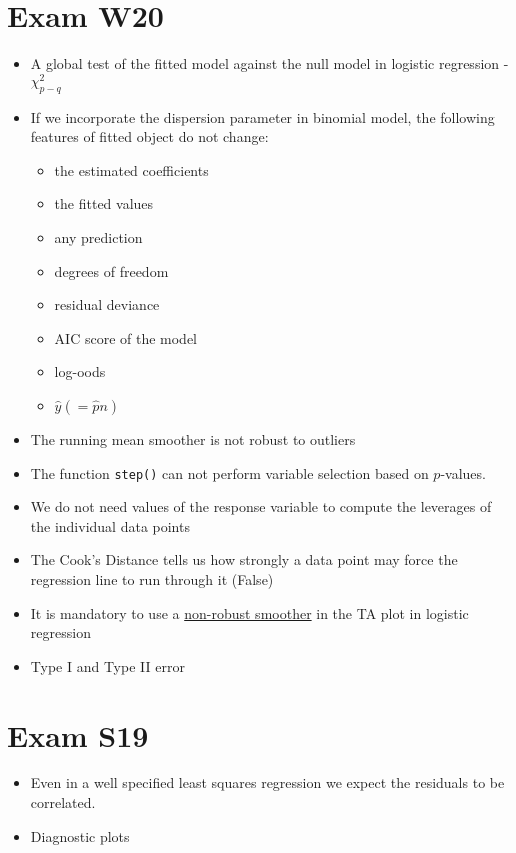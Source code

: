 \documentclass[a4paper]{article}
\begin{document}
\section{Exam W20}
\begin{itemize}
    \item A global test of the fitted model against the null model in logistic regression - $\chi_{p-q}^2$
    \item If we incorporate the dispersion parameter in binomial model, the following features of fitted object do not change:
    \begin{itemize}
        \item the estimated coefficients
        \item the fitted values
        \item any prediction
        \item degrees of freedom
        \item residual deviance
        \item AIC score of the model
        \item log-oods
        \item $\hat{y}(=\hat{p}n)$
    \end{itemize}
    \item The running mean smoother is not robust to outliers
    \item The function \texttt{step()} can not perform variable selection based on $p$-values.
    \item We do not need values of the response variable to compute the leverages of the individual data points
    \item The Cook’s Distance tells us how strongly a data point may force the regression line to run through it (False)
    \item It is mandatory to use a \underline{non-robust smoother} in the TA plot in logistic regression
    \item Type I and Type II error
\end{itemize}

\section{Exam S19}
\begin{itemize}
    \item Even in a well specified least squares regression we expect the residuals to be correlated.
    \item Diagnostic plots
\end{itemize}
\end{document}
